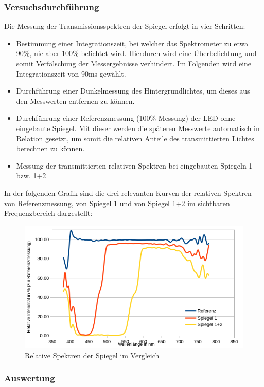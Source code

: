 \newpage
\subsubsection{Versuchsdurchführung}

Die Messung der Transmissionsspektren der Spiegel erfolgt in vier Schritten:
\begin{itemize}
\item Bestimmung einer Integrationszeit, bei welcher das Spektrometer zu etwa 90\%, nie aber 100\% belichtet wird. Hierdurch wird eine Überbelichtung und somit Verfälschung der Messergebnisse verhindert. Im Folgenden wird eine Integrationszeit von 90ms gewählt.
\item Durchführung einer Dunkelmessung des Hintergrundlichtes, um dieses aus den Messwerten entfernen zu können.
\item Durchführung einer Referenzmessung (100\%-Messung) der LED ohne eingebaute Spiegel. Mit dieser werden die späteren Messwerte automatisch in Relation gesetzt, um somit die relativen Anteile des transmittierten Lichtes berechnen zu können.
\item Messung der transmittierten relativen Spektren bei eingebauten Spiegeln 1 bzw. 1+2
\end{itemize}
In der folgenden Grafik sind die drei relevanten Kurven der relativen Spektren von Referenzmessung, von Spiegel 1 und von Spiegel 1+2 im sichtbaren Frequenzbereich dargestellt:

\begin{figure}[h]
	\centering
	\includegraphics[scale=0.8]{Images/V1_Spektren.png}
	\caption{Relative Spektren der Spiegel im Vergleich}
	\label{V1_RES}
\end{figure}

\subsubsection{Auswertung}

